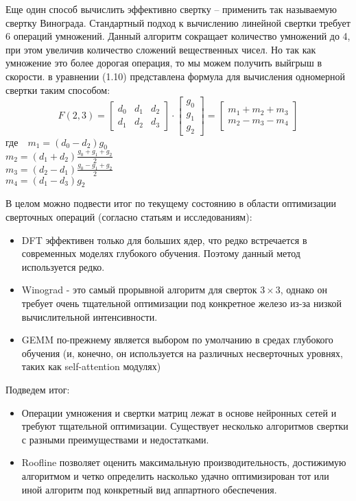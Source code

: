 \documentclass[oneside,final,12pt]{extreport}
\begin{document}
Еще один способ вычислить эффективно свертку – применить так называемую свертку Винограда. Стандартный подход к вычислению линейной свертки требует 6 операций умножений. Данный алгоритм сокращает количество умножений до 4, при этом увеличив количество сложений вещественных чисел. Но так как умножение это более дорогая операция, то мы можем получить выйгрыш в скорости. в уравнении (1.10) представлена формула для вычисления одномерной свертки таким способом:
\begin{equation}
F(2,3) = \begin{bmatrix}
d_0& d_1 & d_2\\ 
d_1&  d_2& d_3
\end{bmatrix} \cdot \begin{bmatrix}
g_0\\ 
g_1\\ 
g_2
\end{bmatrix} = \begin{bmatrix}
m_1+m_2+m_3\\ 
m_2-m_3-m_4
\end{bmatrix}
\end{equation}
где\ \ $m_1=(d_0-d_2)g_0$\\
$m_2=(d_1+d_2)\frac{g_0+g_1+g_2}{2}$\\
$m_3=(d_2-d_1)\frac{g_0-g_1+g_2}{2}$\\
$m_4=(d_1-d_3)g_2$

В целом можно подвести итог по текущему состоянию в области оптимизации сверточных операций (согласно статьям и исследованиям):
\begin{itemize}
\item DFT эффективен только для больших ядер, что редко встречается в современных моделях глубокого обучения. Поэтому данный метод используется редко.
\item Winograd - это самый прорывной алгоритм для сверток $3 \times 3$, однако он требует очень тщательной оптимизации под конкретное железо из-за низкой вычислительной интенсивности.
\item GEMM по-прежнему является выбором по умолчанию в средах глубокого обучения (и, конечно, он используется на различных несверточных уровнях, таких как self-attention модулях)
\end{itemize}

Подведем итог:
\begin{itemize}
\item Операции умножения и свертки матриц лежат в основе нейронных сетей и требуют тщательной оптимизации. Существует несколько алгоритмов свертки с разными преимуществами и недостатками.
\item Roofline позволяет оценить максимальную производительность, достижимую алгоритмом и четко определить насколько удачно оптимизирован тот или иной алгоритм под конкретный вид аппартного обеспечения.
\end{itemize}
\end{document}
